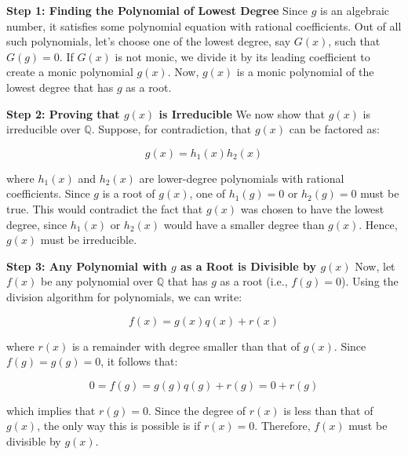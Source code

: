 \documentclass{article}
\newenvironment{proofbox}
  {\begin{mdframed}[linewidth=1pt,linecolor=black,backgroundcolor=white]\noindent\ignorespaces}
  {\end{mdframed}}
\begin{document}
    \begin{proofbox}
     
\textbf{Step 1: Finding the Polynomial of Lowest Degree}
Since \( g \) is an algebraic number, it satisfies some polynomial equation with rational coefficients. Out of all such polynomials, let’s choose one of the lowest degree, say \( G(x) \), such that \( G(g) = 0 \). If \( G(x) \) is not monic, we divide it by its leading coefficient to create a monic polynomial \( g(x) \). Now, \( g(x) \) is a monic polynomial of the lowest degree that has \( g \) as a root.

\textbf{Step 2: Proving that \( g(x) \) is Irreducible}
We now show that \( g(x) \) is irreducible over \( \mathbb{Q} \). Suppose, for contradiction, that \( g(x) \) can be factored as:

\[
g(x) = h_1(x) h_2(x)
\]

where \( h_1(x) \) and \( h_2(x) \) are lower-degree polynomials with rational coefficients. Since \( g \) is a root of \( g(x) \), one of \( h_1(g) = 0 \) or \( h_2(g) = 0 \) must be true. This would contradict the fact that \( g(x) \) was chosen to have the lowest degree, since \( h_1(x) \) or \( h_2(x) \) would have a smaller degree than \( g(x) \). Hence, \( g(x) \) must be irreducible.

\textbf{Step 3: Any Polynomial with \( g \) as a Root is Divisible by \( g(x) \)}
Now, let \( f(x) \) be any polynomial over \( \mathbb{Q} \) that has \( g \) as a root (i.e., \( f(g) = 0 \)). Using the division algorithm for polynomials, we can write:

\[
f(x) = g(x) q(x) + r(x)
\]

where \( r(x) \) is a remainder with degree smaller than that of \( g(x) \). Since \( f(g) = g(g) = 0 \), it follows that:

\[
0 = f(g) = g(g) q(g) + r(g) = 0 + r(g)
\]

which implies that \( r(g) = 0 \). Since the degree of \( r(x) \) is less than that of \( g(x) \), the only way this is possible is if \( r(x) = 0 \). Therefore, \( f(x) \) must be divisible by \( g(x) \).


\end{proofbox}
\end{document}
